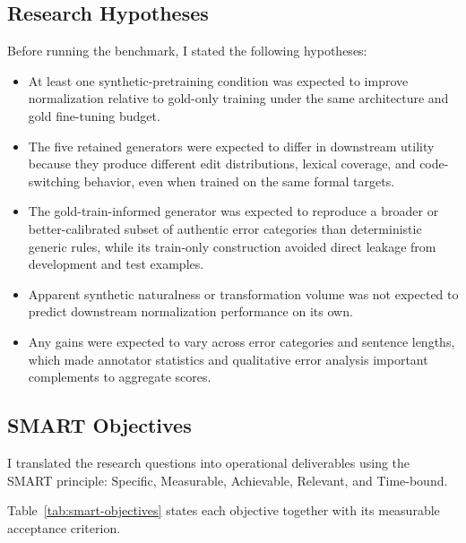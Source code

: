 \documentclass[12pt, a4paper, twoside, openany]{report}
\begin{document}
\subsection{Research Hypotheses}

Before running the benchmark, I stated the following hypotheses:

\begin{itemize}
	\item[\textbf{H1.}] At least one synthetic-pretraining condition was expected to improve normalization relative to gold-only training under the same architecture and gold fine-tuning budget.
	\item[\textbf{H2.}] The five retained generators were expected to differ in downstream utility because they produce different edit distributions, lexical coverage, and code-switching behavior, even when trained on the same formal targets.
	\item[\textbf{H3.}] The gold-train-informed generator was expected to reproduce a broader or better-calibrated subset of authentic error categories than deterministic generic rules, while its train-only construction avoided direct leakage from development and test examples.
	\item[\textbf{H4.}] Apparent synthetic naturalness or transformation volume was not expected to predict downstream normalization performance on its own.
	\item[\textbf{H5.}] Any gains were expected to vary across error categories and sentence lengths, which made annotator statistics and qualitative error analysis important complements to aggregate scores.
\end{itemize}


\subsection{SMART Objectives}

I translated the research questions into operational deliverables using the SMART principle: Specific, Measurable, Achievable, Relevant, and Time-bound.

Table~\ref{tab:smart-objectives} states each objective together with its measurable acceptance criterion.
\end{document}
